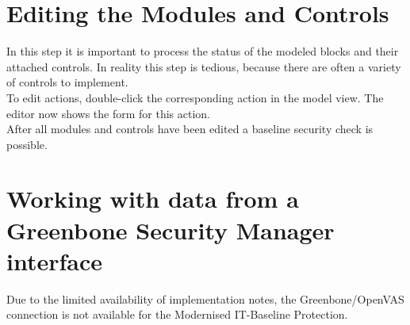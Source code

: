 \documentclass[a4paper,10pt]{book}
\begin{document}
\section{Editing the Modules and Controls}
In this step it is important to process the status of the modeled blocks and their attached controls. In reality this step is tedious, because there are
often a variety of controls to implement.
\newline\\
To edit actions, double-click the corresponding action in the model view. The editor now shows the form for this action.
\newline\\
After all modules and controls have been edited a baseline security check is possible.

\section{Working with data from a Greenbone Security Manager interface} \label{sec:greenbone-sec-manager}
Due to the limited availability of implementation notes, the Greenbone/OpenVAS connection is not available for the Modernised IT-Baseline Protection.
\end{document}
